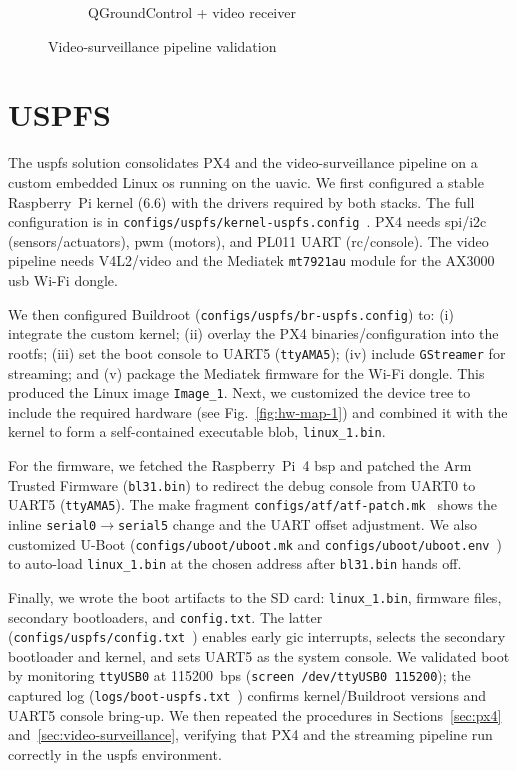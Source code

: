 \begin{figure}[htb!]
\begin{subfigure}[t]{.48\textwidth}
    \caption{QGroundControl + video receiver}%
    \label{fig:px4-qgc-cam-1}
  \end{subfigure}
  \caption{Video-surveillance pipeline validation}%
  \label{fig:px4-qgc-cam}
\end{figure}

\section{USPFS}
\label{sec:uspfs-implem}
The \gls{uspfs} solution consolidates PX4 and the video-surveillance pipeline on
a custom embedded Linux \gls{os} running on the \gls{uavic}. We first configured
a stable Raspberry~Pi kernel (6.6) with the drivers required by both stacks.
The full configuration is in
\lstinline{configs/uspfs/kernel-uspfs.config}~\cite{thesis-sw-github}. PX4 needs
\gls{spi}/\gls{i2c} (sensors/actuators), \gls{pwm} (motors), and PL011 UART
(\gls{rc}/console). The video pipeline needs V4L2/video and the Mediatek
\lstinline{mt7921au} module for the AX3000 \gls{usb} Wi-Fi dongle.

We then configured Buildroot (\lstinline{configs/uspfs/br-uspfs.config}) to:
(i) integrate the custom kernel; (ii) overlay the PX4 binaries/configuration into
the rootfs; (iii) set the boot console to UART5 (\lstinline{ttyAMA5});
(iv) include \lstinline{GStreamer} for streaming; and (v) package the Mediatek
firmware for the Wi-Fi dongle. This produced the Linux image
\lstinline{Image_1}. Next, we customized the device tree to include the required
hardware (see Fig.~\ref{fig:hw-map-1}) and combined it with the kernel to form
a self-contained executable blob, \lstinline{linux_1.bin}.

For the firmware, we fetched the Raspberry~Pi~4 \gls{bsp} and patched the Arm
Trusted Firmware (\lstinline{bl31.bin}) to redirect the debug console from
UART0 to UART5 (\lstinline{ttyAMA5}). The make fragment
\lstinline{configs/atf/atf-patch.mk}~\cite{thesis-sw-github} shows the inline
\lstinline{serial0}\(\rightarrow\)\lstinline{serial5} change and the UART offset
adjustment. We also customized U-Boot
(\lstinline{configs/uboot/uboot.mk} and \lstinline{configs/uboot/uboot.env}~\cite{thesis-sw-github})
to auto-load \lstinline{linux_1.bin} at the chosen address after
\lstinline{bl31.bin} hands off.

Finally, we wrote the boot artifacts to the SD card: \lstinline{linux_1.bin},
firmware files, secondary bootloaders, and \lstinline{config.txt}. The latter
(\lstinline{configs/uspfs/config.txt}~\cite{thesis-sw-github}) enables early \gls{gic}
interrupts, selects the secondary bootloader and kernel, and sets UART5 as the
system console. We validated boot by monitoring \lstinline{ttyUSB0} at 115200~bps
(\lstinline{screen /dev/ttyUSB0 115200}); the captured log
(\lstinline{logs/boot-uspfs.txt}~\cite{thesis-sw-github}) confirms kernel/Buildroot
versions and UART5 console bring-up. We then repeated the procedures in
Sections~\ref{sec:px4} and~\ref{sec:video-surveillance}, verifying that PX4 and
the streaming pipeline run correctly in the \gls{uspfs} environment.

